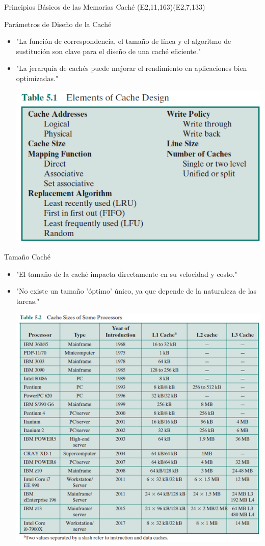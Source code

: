 \documentclass[presentation]{beamer}
\begin{document}
\begin{frame}[label={sec:orge6152e4}]{Principios Básicos de las Memorias Caché (E2,11,163)(E2,7,133)}
\begin{block}{Parámetros de Diseño de la Caché}
\begin{itemize}
\item "La función de correspondencia, el tamaño de línea y el algoritmo de sustitución
son clave para el diseño de una caché eficiente."
\item "La jerarquía de cachés puede mejorar el rendimiento en aplicaciones bien optimizadas."
\begin{center}
\includegraphics[width=.9\linewidth]{./Imagenes/tabla5.1.png}
\end{center}
\end{itemize}
\end{block}


\begin{block}{Tamaño Caché}
\begin{itemize}
\item "El tamaño de la caché impacta directamente en su velocidad y costo."
\item "No existe un tamaño 'óptimo' único, ya que depende de la naturaleza de las tareas."
\begin{center}
\includegraphics[width=.9\linewidth]{./Imagenes/tabla5.2.png}
\end{center}
\end{itemize}
\end{block}


\end{frame}
\end{document}
